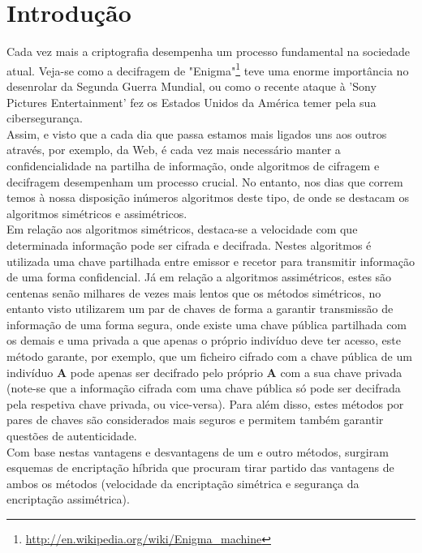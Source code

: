 \documentclass[a4paper,11pt,openright,oneside]{report}
\begin{document}
\tableofcontents
\listoffigures

\clearpage
{}

\chapter{Introdução}
\label{chap.introdução}

Cada vez mais a criptografia desempenha um processo fundamental na sociedade atual. Veja-se como a decifragem de "Enigma"\footnote{\url{http://en.wikipedia.org/wiki/Enigma_machine}} teve uma enorme importância no desenrolar da Segunda Guerra Mundial, ou como o recente ataque à 'Sony Pictures Entertainment' fez os Estados Unidos da América temer pela sua cibersegurança.\\

Assim, e visto que a cada dia que passa estamos mais ligados uns aos outros através, por exemplo, da Web, é cada vez mais necessário manter a confidencialidade na partilha de informação, onde algoritmos de cifragem e decifragem desempenham um processo crucial. No entanto, nos dias que correm temos à nossa disposição inúmeros algoritmos deste tipo, de onde se destacam os algoritmos simétricos e assimétricos.\\

Em relação aos algoritmos simétricos, destaca-se a velocidade com que determinada informação pode ser cifrada e decifrada. Nestes algoritmos é utilizada uma chave partilhada entre emissor e recetor para transmitir informação de uma forma confidencial. Já em relação a algoritmos assimétricos, estes são centenas senão milhares de vezes mais lentos que os métodos simétricos, no entanto visto utilizarem um par de chaves de forma a garantir transmissão de informação de uma forma segura, onde existe uma chave pública partilhada com os demais e uma privada a que apenas o próprio indivíduo deve ter acesso, este método garante, por exemplo, que um ficheiro cifrado com a chave pública de um indivíduo \textbf{A} pode apenas ser decifrado pelo próprio \textbf{A} com a sua chave privada (note-se que a informação cifrada com uma chave pública só pode ser decifrada pela respetiva chave privada, ou vice-versa). Para além disso, estes métodos por pares de chaves são considerados mais seguros e permitem também garantir questões de autenticidade.\\

Com base nestas vantagens e desvantagens de um e outro métodos, surgiram esquemas de encriptação híbrida que procuram tirar partido das vantagens de ambos os métodos (velocidade da encriptação simétrica e segurança da encriptação assimétrica).
\end{document}
